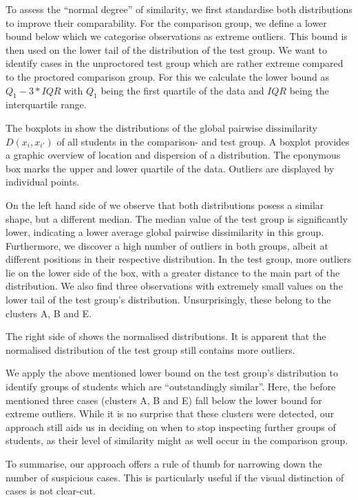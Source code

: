 \documentclass{edm_article}
\begin{document}
To assess the ``normal degree'' of similarity, we first standardise both distributions to improve their comparability. For the comparison group, we define a lower bound below which we categorise observations as extreme outliers. This bound is then used on the lower tail of the distribution of the test group. We want to identify cases in the unproctored test group which are rather extreme compared to the proctored comparison group. For this we calculate the lower bound as $Q_1 - 3 * IQR$ with $Q_1$ being the first quartile of the data and $IQR$ being the interquartile range. 

The boxplots in  show the distributions of the global pairwise dissimilarity $D(x_i, x_{i'})$ of all students in the comparison- and test group. A boxplot provides a graphic overview of location and dispersion of a distribution. The eponymous box marks the upper and lower quartile of the data. Outliers are displayed by individual points.

On the left hand side of  we observe that both distributions posess a similar shape, but a different median. The median value of the test group is significantly lower, indicating a lower average global pairwise dissimilarity in this group. Furthermore, we discover a high number of outliers in both groups, albeit at different positions in their respective distribution. In the test group, more outliers lie on the lower side of the box, with a greater distance to the main part of the distribution. We also find three observations with extremely small values on the lower tail of the test group's distribution. Unsurprisingly, these belong to the clusters A, B and E.

The right side of  shows the normalised distributions. It is apparent that the normalised distribution of the test group still contains more outliers. 

We apply the above mentioned lower bound on the test group's distribution to identify groups of students which are ``outstandingly similar''. Here, the before mentioned three cases (clusters A, B and E) fall below the lower bound for extreme outliers. While it is no surprise that these clusters were detected, our approach still aids us in deciding on when to stop inspecting further groups of students, as their level of similarity might as well occur in the comparison group.

To summarise, our approach offers a rule of thumb for narrowing down the number of suspicious cases. This is particularly useful if the visual distinction of cases is not clear-cut. 
\end{document}
